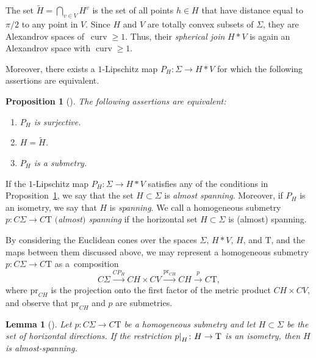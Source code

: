 \documentclass[10pt,a4paper]{amsart}
\numberwithin{equation}{section}
\newtheorem{lem}[thm]{Lemma}
\newtheorem{prop}[thm]{Proposition}
\theoremstyle{definition}
\DeclareMathOperator{\curv}{curv}
\newcommand{\Tau}{\mathrm{T}}
\newcommand\restr[2]{{%
		\left.\kern-\nulldelimiterspace %
		#1 %
		\right|_{#2} %
}}
\begin{document}
The set $\widetilde{H}= \bigcap_{v\in V} H^v$ is the set of all points $h\in H$ that have distance equal to $\pi/2$ to any point in $V$. %
Since $H$ and $V$ are totally convex subsets of $\Sigma$, they are Alexandrov spaces of~${\curv \geq 1}$. Thus, their \emph{spherical join} $H*V$ is again an Alexandrov space with $\curv\geq 1$.

Moreover, there exists a $1$-Lipschitz map $P_{H}\colon \Sigma \to H\ast V$ for which the following assertions are equivalent.
	


\begin{prop}[]
\label{P:LYTCHAK_SPANNING_SUBMETRY}
The following assertions are equivalent:
\begin{enumerate}\itemsep=0pt
\item[$(1)$] $P_H$ is surjective.
\item[$(2)$] $H = \widetilde{H}$.
\item[$(3)$] $P_H$ is a submetry.
\end{enumerate}
\end{prop}

If the $1$-Lipschitz map $P_H\colon \Sigma\to H\ast V$ satisfies any of the conditions in Proposition~\ref{P:LYTCHAK_SPANNING_SUBMETRY}, we say that the set $H\subset \Sigma$ is \emph{almost spanning}. Moreover, if $P_{H}$ is an isometry, we say that $H$ is \emph{spanning}. We call a homogeneous submetry $p\colon C\Sigma\to C\Tau$ \emph{$($almost$)$ spanning} if the horizontal set $H\subset \Sigma$ is (almost) spanning.
	
By considering the Euclidean cones over the spaces $\Sigma$, $H\ast V$, $H$, and $\Tau$, and the maps between them discussed above, we may represent a homogeneous submetry $p\colon C\Sigma\to C\Tau$ as a~composition
\[
	C\Sigma \overset{CP_H}{\longrightarrow} CH\times CV \overset{\mathrm{pr}_{CH}}{\longrightarrow} CH\overset{p}{\longrightarrow} C\Tau,
\]
where $\mathrm{pr}_{CH}$ is the projection onto the first factor of the metric product $CH\times CV$, and observe that $\mathrm{pr}_{CH}$ and $p$ are submetries.

\begin{lem}[]
\label{L: submetry restricted to horizontal part is an isometry implies space of directions splits into horizontal and vertical}
Let $p\colon C\Sigma\to C\Tau$ be a homogeneous submetry and let $H\subset \Sigma$ be the set of horizontal directions.
If the restriction $\restr{p}{H}\colon H\to \Tau$ is an isometry, then $H$ is almost-spanning.
\end{lem}
	
\end{document}
